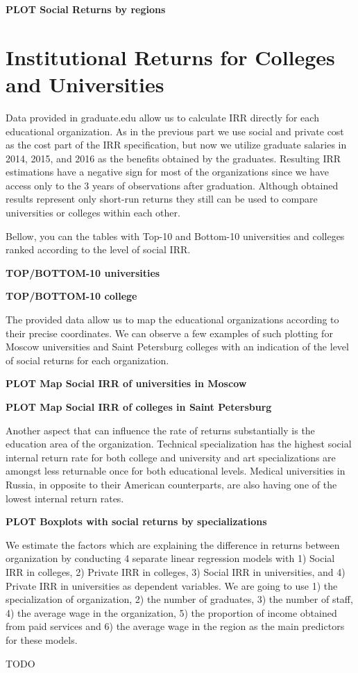 \documentclass[alpha-refs]{wiley-article-05g}
\begin{document}
\textbf{PLOT Social Returns by regions}


\section{Institutional Returns for Colleges and Universities}

Data provided in graduate.edu allow us to calculate IRR directly for each educational organization. As in the previous part we use social and private cost as the cost part of the IRR specification, but now we utilize graduate salaries in 2014, 2015, and 2016 as the benefits obtained by the graduates. Resulting IRR estimations have a negative sign for most of the organizations since we have access only to the 3 years of observations after graduation. Although obtained results represent only short-run returns they still can be used to compare universities or colleges within each other.

Bellow, you can the tables with Top-10 and Bottom-10 universities and colleges ranked according to the level of social IRR.

\textbf{TOP/BOTTOM-10 universities}

\textbf{TOP/BOTTOM-10 college}

The provided data allow us to map the educational organizations according to their precise coordinates. We can observe a few examples of such plotting for Moscow universities and Saint Petersburg colleges with an indication of the level of social returns for each organization.

\textbf{PLOT Map Social IRR of universities in Moscow}

\textbf{PLOT Map Social IRR of colleges in Saint Petersburg}

Another aspect that can influence the rate of returns substantially is the education area of the organization. Technical specialization has the highest social internal return rate for both college and university and art specializations are amongst less returnable once for both educational levels. Medical universities in Russia, in opposite to their American counterparts, are also having one of the lowest internal return rates.

\textbf{PLOT Boxplots with social returns by specializations}

We estimate the factors which are explaining the difference in returns between organization by conducting 4 separate linear regression models with 1) Social IRR in colleges, 2) Private IRR in colleges, 3) Social IRR in universities, and 4) Private IRR in universities as dependent variables. We are going to use 1) the specialization of organization, 2) the number of graduates, 3) the number of staff, 4) the average wage in the organization, 5) the proportion of income obtained from paid services and 6) the average wage in the region as the main predictors for these models.

TODO




\newpage
\printbibliography
\end{document}
